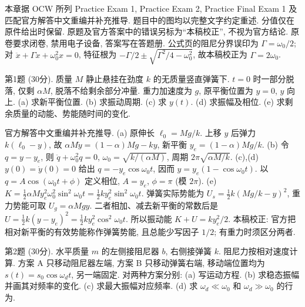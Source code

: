 本章据 OCW 所列 Practice Exam 1, Practice Exam 2, Practice Final Exam 1 及匹配官方解答中文重编并补充推导. 题目中的图均以完整文字约定重述. 分值仅在原件给出时保留. 原题及官方答案中的错误另标为``本稿校正'', 不视为官方结论.
原卷要求闭卷, 禁用电子设备, 答案写在答题册. 公式页的阻尼分界误印为 $\Gamma=\omega_0/2$; 对 $\ddot x+\Gamma\dot x+\omega_0^2x=0$, 特征根为 $-\Gamma/2\pm\sqrt{\Gamma^2/4-\omega_0^2}$, 故本稿校正为 $\Gamma=2\omega_0$.
\begin{exercise}\label{exam:e1.1}
第1题 (30分). 质量 $M$ 静止悬挂在劲度 $k$ 的无质量竖直弹簧下. $t=0$ 时一部分脱落, 仅剩 $\alpha M$, 脱落不给剩余部分冲量. 重力加速度为 $g$, 原平衡位置为 $y=0$, $y$ 向上. (a) 求新平衡位置. (b) 求振动周期. (c) 求 $y(t)$. (d) 求振幅及相位. (e) 求剩余质量的动能、势能随时间的变化.
\end{exercise}
\begin{solution}
官方解答中文重编并补充推导. (a) 原伸长 $\ell_0=Mg/k$. 上移 $y$ 后弹力 $k(\ell_0-y)$, 故 $\alpha M\ddot y=(1-\alpha)Mg-ky$, 新平衡 $y_e=(1-\alpha)Mg/k$.
(b) 令 $q=y-y_e$, 则 $\ddot q+\omega_0^2q=0$, $\omega_0=\sqrt{k/(\alpha M)}$, 周期 $2\pi\sqrt{\alpha M/k}$.
(c),(d) $y(0)=\dot y(0)=0$ 给出 $q=-y_e\cos\omega_0t$, 因而 $y=y_e(1-\cos\omega_0t)$. 以 $q=A\cos(\omega_0t+\phi)$ 定义相位, $A=y_e$, $\phi=\pi$ (模 $2\pi$).
(e) $K=\tfrac12\alpha M y_e^2\omega_0^2\sin^2\omega_0t=\tfrac12ky_e^2\sin^2\omega_0t$. 弹簧实际势能为 $U_s=\tfrac12 k(Mg/k-y)^2$, 重力势能可取 $U_g=\alpha Mgy$. 二者相加、减去新平衡的常数后是 $U=\tfrac12k(y-y_e)^2=\tfrac12ky_e^2\cos^2\omega_0t$. 所以振动能 $K+U=ky_e^2/2$. 本稿校正: 官方把相对新平衡的有效势能称作弹簧势能, 且总能少写因子 $1/2$; 有重力时须区分两者.
\end{solution}
\begin{exercise}\label{exam:e1.2}
第2题 (30分). 水平质量 $m$ 的左侧接阻尼器 $b$, 右侧接弹簧 $k$. 阻尼力按相对速度计算. 方案 A 只移动阻尼器左端, 方案 B 只移动弹簧右端, 移动端位置均为 $s(t)=s_0\cos\omega_dt$, 另一端固定. 对两种方案分别: (a) 写运动方程. (b) 求稳态振幅并画其对频率的变化. (c) 求最大振幅对应频率. (d) 求 $\omega_d\ll\omega_0$ 和 $\omega_d\gg\omega_0$ 的行为.
\end{exercise}
